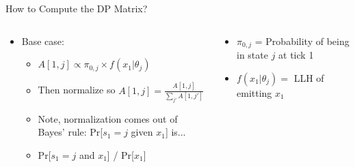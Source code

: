 \documentclass[aspectratio=169]{beamer}
\begin{document}
\begin{frame}{How to Compute the DP Matrix?}

\begin{columns}[T]
\begin{column}{0.5\textwidth}
\begin{itemize}
\item Base case:
	\begin{itemize}
	\item $A[1,j] \propto \pi_{0,j} \times f (x_1 | \theta_j)$
	\item Then normalize so $A[1,j] = \frac{A[1,j]}{\sum_{j'} A[1,j']}$
	\item Note, normalization comes out of Bayes' rule: Pr[$s_1 = j$ given $x_1$] is...
	\item Pr[$s_1 = j$ and $x_1$] / Pr[$x_1$]
	\end{itemize}
\end{itemize}
\end{column}
\begin{column}{0.5\textwidth}
	\begin{itemize}
	\item $\pi_{0,j}$ = Probability of being in state $j$ at tick 1
	\item $f (x_1 | \theta_j) = $ LLH of emitting $x_1$
	\end{itemize}
\end{column}
\end{columns}
\end{frame}
\end{document}
